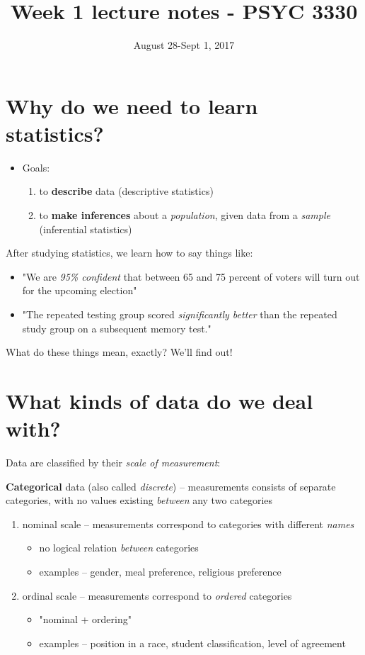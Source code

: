 \documentclass[11pt]{article}
\date{August 28-Sept 1, 2017}
\title{Week 1 lecture notes - PSYC 3330}
\begin{document}
\maketitle

\section*{Why do we need to learn statistics?}
\label{sec-1}

\begin{itemize}
\item Goals:
\begin{enumerate}
\item to \textbf{describe} data (descriptive statistics)
\item to \textbf{make inferences} about a \emph{population}, given data from a \emph{sample} (inferential statistics)
\end{enumerate}
\end{itemize}

After studying statistics, we learn how to say things like:
\begin{itemize}
\item "We are \emph{95\% confident} that between 65 and 75 percent of voters will turn out for the upcoming election"
\item "The repeated testing group scored \emph{significantly better} than the repeated study group on a subsequent memory test."
\end{itemize}

What do these things mean, exactly?  We'll find out!

\section*{What kinds of data do we deal with?}
\label{sec-2}

Data are classified by their \emph{scale of measurement}:

\textbf{Categorical} data (also called \emph{discrete}) -- measurements consists of separate categories, with no values existing \emph{between} any two categories
\begin{enumerate}
\item nominal scale -- measurements correspond to categories with different \emph{names}
\begin{itemize}
\item no logical relation \emph{between} categories
\item examples -- gender, meal preference, religious preference
\end{itemize}

\item ordinal scale -- measurements correspond to \emph{ordered} categories
\begin{itemize}
\item "nominal + ordering"
\item examples -- position in a race, student classification, level of agreement
\end{itemize}
\end{enumerate}
\end{document}
